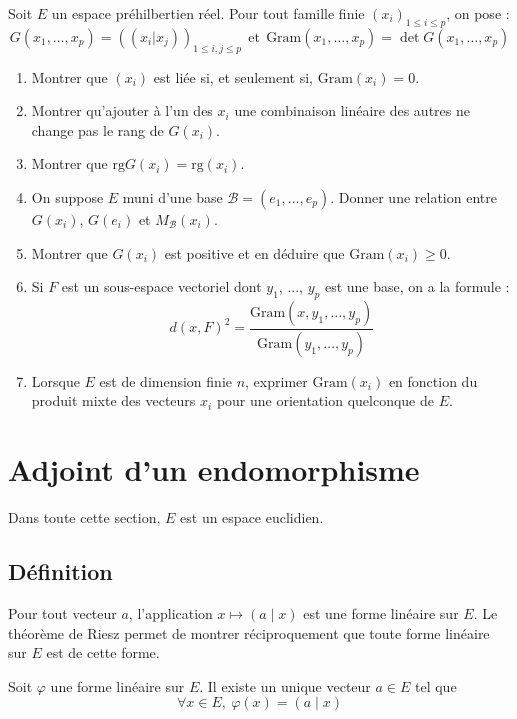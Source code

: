 \documentclass[french]{article}
\theoremstyle{plain}
\theoremstyle{definition}
\theoremstyle{remark}
\begin{document}
Soit $E$ un espace préhilbertien réel. Pour tout famille finie $(x_i)_{1\leqslant i\leqslant p}$, on pose : $$G(x_1,\ldots,x_p)=((x_i|x_j))_{1\leqslant i,j\leqslant p}\ \ \text{et} \ \ \text{Gram}(x_1,\ldots,x_p)=\det G(x_1,\ldots,x_p)$$
\begin{enumerate}
	\item Montrer que $(x_i)$ est liée si, et seulement si, $\text{Gram}(x_i)=0$.
	\item Montrer qu'ajouter à l'un des $x_i$ une combinaison linéaire des autres ne change pas le rang de $G(x_i)$.
	\item Montrer que $\text{rg}G(x_i)=\text{rg}(x_i)$.
	\item On suppose $E$ muni d'une base $\mathcal{B}=(e_1,\ldots,e_p)$. Donner une relation entre $G(x_i)$, $G(e_i)$ et $M_\mathcal{B}(x_i)$.
	\item Montrer que $G(x_i)$ est positive et en déduire que $\text{Gram}(x_i)\geqslant0$.
	\item Si $F$ est un sous-espace vectoriel dont $y_1$, ..., $y_p$ est une base, on a la formule : $$d(x,F)^2=\frac{\text{Gram}(x,y_1,\ldots,y_p)}{\text{Gram}(y_1,\ldots,y_p)}$$
	\item Lorsque $E$ est de dimension finie $n$, exprimer $\text{Gram}(x_i)$ en fonction du produit mixte des vecteurs $x_i$ pour une orientation quelconque de $E$.
\end{enumerate}

\section{Adjoint d'un endomorphisme}

Dans toute cette section, $E$ est un espace euclidien.

\subsection{Définition}

Pour tout vecteur $a$, l'application $x\mapsto (a\mid x)$ est une forme linéaire sur $E$. Le théorème de Riesz permet de montrer réciproquement que toute forme linéaire sur $E$ est de cette forme.

\begin{thm}
	Soit $\varphi$ une forme linéaire sur $E$. Il existe un unique vecteur $a\in E$ tel que $$\forall x\in E,\ \varphi(x)=(a\mid x)$$
\end{thm}
\end{document}
